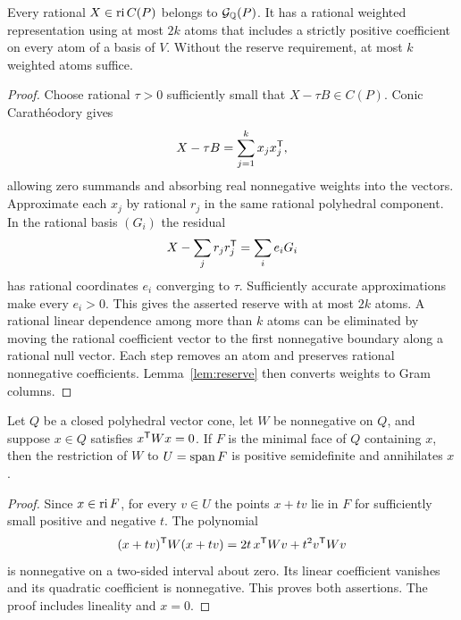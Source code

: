 \begin{lemma}\label{lem:interior}
Every rational $X\in\operatorname{ri} C(P)$ belongs to $\mathcal G_{\mathbb Q}(P)$. It has a rational weighted representation using at most $2k$ atoms that includes a strictly positive coefficient on every atom of a basis of $V$. Without the reserve requirement, at most $k$ weighted atoms suffice.
\end{lemma}
\begin{proof}
Choose rational $\tau>0$ sufficiently small that $X-\tau B\in C(P)$. Conic Carath\'eodory gives
\[
 X-\tau B=\sum_{j=1}^{k}x_jx_j^{\mathsf T},
\]
allowing zero summands and absorbing real nonnegative weights into the vectors. Approximate each $x_j$ by rational $r_j$ in the same rational polyhedral component. In the rational basis $(G_i)$ the residual
\[
 X-\sum_jr_jr_j^{\mathsf T}=\sum_i e_iG_i
\]
has rational coordinates $e_i$ converging to $\tau$. Sufficiently accurate approximations make every $e_i>0$. This gives the asserted reserve with at most $2k$ atoms. A rational linear dependence among more than $k$ atoms can be eliminated by moving the rational coefficient vector to the first nonnegative boundary along a rational null vector. Each step removes an atom and preserves rational nonnegative coefficients. Lemma~\ref{lem:reserve} then converts weights to Gram columns.
\end{proof}

\begin{lemma}\label{lem:stationarity}
Let $Q$ be a closed polyhedral vector cone, let $W$ be nonnegative on $Q$, and suppose $x\in Q$ satisfies $x^{\mathsf T} Wx=0$. If $F$ is the minimal face of $Q$ containing $x$, then the restriction of $W$ to $U=\operatorname{span} F$ is positive semidefinite and annihilates $x$.
\end{lemma}
\begin{proof}
Since $x\in\operatorname{ri} F$, for every $v\in U$ the points $x+tv$ lie in $F$ for sufficiently small positive and negative $t$. The polynomial
\[
 (x+tv)^{\mathsf T} W(x+tv)=2t\,x^{\mathsf T} Wv+t^2v^{\mathsf T} Wv
\]
is nonnegative on a two-sided interval about zero. Its linear coefficient vanishes and its quadratic coefficient is nonnegative. This proves both assertions. The proof includes lineality and $x=0$.
\end{proof}

